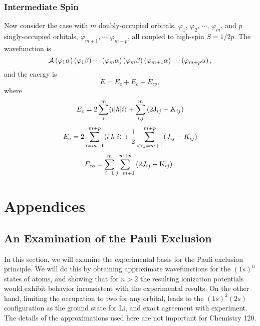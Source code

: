 {\subsubsection{Intermediate Spin}
\label{chap4-sect4.4}

Now consider the case with $m$ doubly-occupied orbitals, $\varphi_1$, 
$\varphi_2$, $\cdots$, $\varphi_m$, and $p$
singly-occupied orbitals, $\varphi_{m+1}, \cdots , \varphi_{m+p}$, all coupled 
to high-spin $S = 1/2p$.  The wavefunction is
\begin{equation}
{\cal A} \left( \varphi_1 \alpha \right) \left( \varphi_1 \beta \right) \cdots 
\left( \varphi_m \alpha \right) \left( \varphi_m \beta \right) \left( 
\varphi_{m+1} \alpha \right) \cdots \left( \varphi_{m+p} \alpha \right),
\end{equation}
and the energy is
\begin{equation}
E = E_c + E_o + E_{co} ,
\end{equation}
where
\begin{equation}
E_c = 2 \sum^m_i \langle i | h | i \rangle + \sum^m_{i,j} \left( 2 {\rm 
J}_{ij} - K_{ij} \right)
\end{equation}
\begin{equation}
E_o = 2 \sum^{m+p}_{i=m+1} \langle i | h | i \rangle + {1 \over 2} 
\sum^{m+p}_{i>j=m+1} \left( J_{ij} - K_{ij} \right)
\end{equation}
\begin{equation}
E_{co} = \sum^m_{i=1} \sum^{m+p}_{j=m+1} \left( 2 J_{ij} - {\rm 
K}_{ij} \right) .
\end{equation}

\section{Appendices}

\subsection{An Examination of the Pauli Exclusion}
\label{chap4-app-a}

In this section, we will examine the experimental basis for the Pauli exclusion
principle.  We will do this by obtaining approximate wavefunctions for 
the $(1s)^n$ states of atoms, and showing that for $n > 2$ the resulting 
ionization potentials would exhibit behavior inconsistent with the 
experimental results.  On the other hand, limiting the
occupation to two for any orbital, leads to the $(1s)^2(2s)$ 
configuration as the ground state for Li, and exact
agreement with experiment.  The details of the approximations used here are not
important for Chemistry 120.

}

